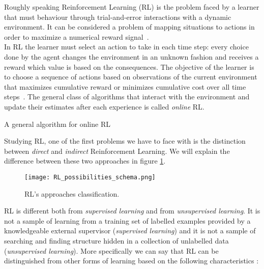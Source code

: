 Roughly speaking Reinforcement Learning (RL) is the problem faced by a learner that must behaviour through trial-and-error interactions with a dynamic environment. It can be considered a problem of mapping situations to actions in order to maximize a numerical reward signal~\cite{RLDef1}. \\

In RL the learner must select an action to take in each time step: every choice done by the agent changes the environment in an unknown fashion and receives a reward which value is based on the consequences. The objective of the learner is to choose a sequence of actions based on observations of the current environment that maximizes cumulative reward or minimizes cumulative cost over all time steps~\cite{LiMalik}. The general class of algorithms that interact with the environment and update their estimates after each experience is called \textit{online} RL.

\begin{algorithm}
	\caption{A general algorithm for online RL~\cite{wiering2012reinforcement}}
\end{algorithm}

Studying RL, one of the first problems we have to face with is the distinction between \textit{direct} and \textit{indirect} Reinforcement Learning. We will explain the difference between these two approaches in figure \ref{fig:RL_possibilities_schema}.


\begin{figure} [h!]
		\centering
		\texttt{[image: RL\_possibilities\_schema.png]}
		\caption{RL's approaches classification.}
		\label{fig:RL_possibilities_schema}
\end{figure}


RL is different both from \textit{supervised learning} and from \textit{unsupervised learning}. It is not a sample of learning from a training set of labelled examples provided by a knowledgeable external supervisor (\textit{supervised learning}) and it is not a sample of searching and finding structure hidden in a collection of unlabelled data (\textit{unsupervised learning}). More specifically we can say that RL can be distinguished from other forms of learning based on the following characteristics :

